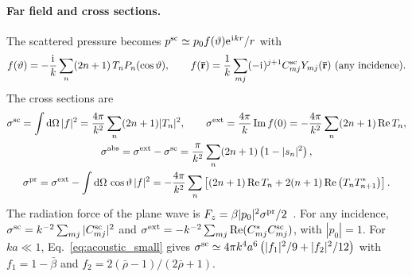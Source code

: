 \documentclass[
    pra,
    aps,
    reprint,
    onecolumn,
    amsmath,amssymb,
    a4paper,
    superscriptaddress,
    10pt,
    nofootinbib
]{revtex4-2}
\newcommand{\iu}{\mathrm{i}\mkern1mu}                 %
\newcommand{\eu}{\mathrm{e}\mkern1mu}                 %
\newcommand{\ort}[1]{\boldsymbol{\mathbf{\bar{#1}}}}  %
\newcommand{\rb}{\bar{\rho}}
\newcommand{\bb}{\bar{\beta}}
\begin{document}
\paragraph{Far field and cross sections.}
The scattered pressure becomes $p^{\rm sc} \simeq p_0 f(\vartheta)\eu^{\iu kr}/r$ with
\begin{equation}
    f(\vartheta) = -\frac{\iu}{k}\sum_n(2n+1)\, T_n P_n(\cos\vartheta), \qquad
    f(\ort{r}) = \frac{1}{k}\sum_{mj}(-\iu)^{j+1}C^{\rm sc}_{mj}Y_{mj}(\ort{r})\ \text{(any incidence)}.
    \label{eq:acoustic_farfield}
\end{equation}
The cross sections are
\begin{gather}
    \sigma^{\rm sc} = \int\dd\Omega\, |f|^2 = \frac{4\pi}{k^2}\sum_n(2n+1)|T_n|^2, \qquad
    \sigma^{\rm ext} = \frac{4\pi}{k}\Im f(0) = -\frac{4\pi}{k^2}\sum_n(2n+1)\Re T_n,
    \nonumber \\
    \sigma^{\rm abs} = \sigma^{\rm ext} - \sigma^{\rm sc} = \frac{\pi}{k^2}\sum_n(2n+1)\left(1 - |s_n|^2\right),
    \label{eq:acoustic_sigma}
    \\
    \sigma^{\rm pr} = \sigma^{\rm ext} - \int\dd\Omega\, \cos\vartheta\, |f|^2 = -\frac{4\pi}{k^2}\sum_n\left[(2n+1)\Re T_n + 2(n+1)\Re\left(T_n T^*_{n+1}\right)\right].
    \label{eq:acoustic_pr}
\end{gather}
The radiation force of the plane wave is $F_z = \beta|p_0|^2\sigma^{\rm pr}/2$~\cite{Hasegawa1977JASA,Thesis}.
For any incidence, $\sigma^{\rm sc} = k^{-2}\sum_{mj}|C^{\rm sc}_{mj}|^2$ and $\sigma^{\rm ext} = -k^{-2}\sum_{mj}\Re(C^*_{mj}C^{\rm sc}_{mj})$, with $|p_0| = 1$.
For $ka \ll 1$, Eq.~\eqref{eq:acoustic_small} gives $\sigma^{\rm sc} \simeq 4\pi k^4a^6\left(|f_1|^2/9 + |f_2|^2/12\right)$ with $f_1 = 1 - \bb$ and $f_2 = 2(\rb - 1)/(2\rb + 1)$.



\end{document}
